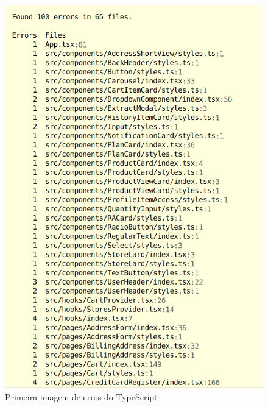 \begin{figure}[h]
	\centering
	\includegraphics[keepaspectratio=true,scale=0.4]{figuras/tserros1.png}
	\caption{Primeira imagem de erros do TypeScript}
	\label{erro-ts-1}
\end{figure}


